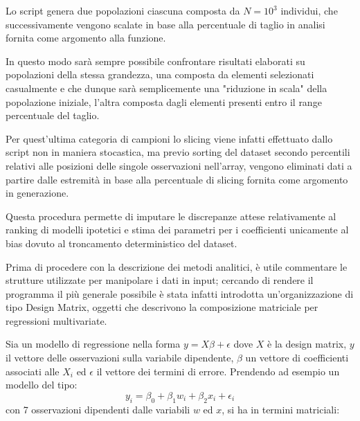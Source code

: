 \documentclass[a4paper]{report}
\begin{document}
Lo script genera due popolazioni ciascuna composta da $N=10^3$ individui, che successivamente vengono scalate in base alla percentuale di taglio in analisi fornita come argomento alla funzione.

In questo modo sarà sempre possibile confrontare risultati elaborati su popolazioni della stessa grandezza, una composta da elementi selezionati casualmente e che dunque sarà semplicemente una "riduzione in scala" della popolazione iniziale, l'altra composta dagli elementi presenti entro il range percentuale del taglio.

Per quest'ultima categoria di campioni lo slicing viene infatti effettuato dallo script non in maniera stocastica, ma previo sorting del dataset secondo percentili relativi alle posizioni delle singole osservazioni nell'array, vengono eliminati dati a partire dalle estremità in base alla percentuale di slicing fornita come argomento in generazione.

Questa procedura permette di imputare le discrepanze attese relativamente al ranking di modelli ipotetici e stima dei parametri per i coefficienti unicamente al bias dovuto al troncamento deterministico del dataset.

Prima di procedere con la descrizione dei metodi analitici, è utile commentare le strutture utilizzate per manipolare i dati in input; cercando di rendere il programma il più generale possibile è stata infatti introdotta un'organizzazione di tipo Design Matrix, oggetti che descrivono la  composizione matriciale per regressioni multivariate.

Sia un modello di regressione nella forma $y=X\beta+\epsilon$ dove $X$ è la design matrix, $y$ il vettore delle osservazioni sulla variabile dipendente, $\beta$ un vettore di coefficienti associati alle $X_i$ ed $\epsilon $ il vettore dei termini di errore.
Prendendo ad esempio un modello del tipo:
\[y_i = \beta_0 + \beta_1 w_i + \beta_2 x_i + \epsilon_i \]
con 7 osservazioni dipendenti dalle variabili $w$ ed $x$, si ha in termini matriciali:
\end{document}
